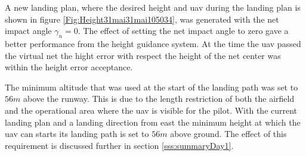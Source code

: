 A new landing plan, where the desired height and \gls{uav} during the landing plan is shown in figure \ref{Fig:Height31mai31mai105034}, was generated with the net impact angle $\gamma_n = 0$. The effect of setting the net impact angle to zero gave a better performance from the height guidance system. At the time the \gls{uav} passed the virtual net the hight error with respect the height of the net center was within the height error acceptance.

The minimum altitude that was used at the start of the landing path was set to $56 m$ above the runway. This is due to the length restriction of both the airfield and the operational area where the \gls{uav} is visible for the pilot. With the current landing plan and a landing direction from east the minimum height at which the \gls{uav} can starts its landing path is set to $56 m$ above ground. The effect of this requirement is discussed further in section \ref{sss:summaryDay1}.

